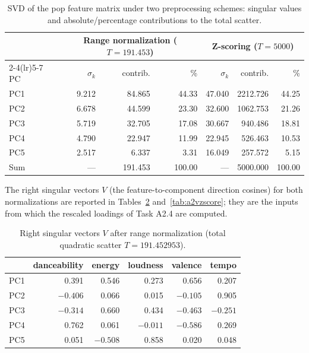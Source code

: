 \documentclass[11pt,letterpaper]{article}
\begin{document}
\begin{table}[H]
\centering
\caption{SVD of the pop feature matrix under two preprocessing schemes:
singular values and absolute/percentage contributions to the total scatter.}
\label{tab:a2svd}
\small
\begin{tabular}{lrrrrrr}
\toprule
 & \multicolumn{3}{c}{Range normalization ($T=191.453$)} & \multicolumn{3}{c}{Z-scoring ($T=5000$)} \\
\cmidrule(lr){2-4}\cmidrule(lr){5-7}
PC & $\sigma_k$ & contrib. & \% & $\sigma_k$ & contrib. & \% \\
\midrule
PC1 & 9.212 & 84.865 & 44.33 & 47.040 & 2212.726 & 44.25 \\
PC2 & 6.678 & 44.599 & 23.30 & 32.600 & 1062.753 & 21.26 \\
PC3 & 5.719 & 32.705 & 17.08 & 30.667 & 940.486  & 18.81 \\
PC4 & 4.790 & 22.947 & 11.99 & 22.945 & 526.463  & 10.53 \\
PC5 & 2.517 & 6.337  & 3.31  & 16.049 & 257.572  & 5.15  \\
\midrule
Sum & --- & 191.453 & 100.00 & --- & 5000.000 & 100.00 \\
\bottomrule
\end{tabular}
\end{table}

The right singular vectors $V$ (the feature-to-component direction cosines)
for both normalizations are reported in Tables~\ref{tab:a2vrange}
and~\ref{tab:a2vzscore}; they are the inputs from which the rescaled loadings
of Task A2.4 are computed.

\begin{table}[H]
\centering
\caption{Right singular vectors $V$ after range normalization (total
quadratic scatter $T = 191.452953$).}
\label{tab:a2vrange}
\small
\begin{tabular}{lrrrrr}
\toprule
 & danceability & energy & loudness & valence & tempo \\
\midrule
PC1 &  0.391 &  0.546 &  0.273 &  0.656 &  0.207 \\
PC2 & $-0.406$ &  0.066 &  0.015 & $-0.105$ &  0.905 \\
PC3 & $-0.314$ &  0.660 &  0.434 & $-0.463$ & $-0.251$ \\
PC4 &  0.762 &  0.061 & $-0.011$ & $-0.586$ &  0.269 \\
PC5 &  0.051 & $-0.508$ &  0.858 &  0.020 &  0.048 \\
\bottomrule
\end{tabular}
\end{table}
\end{document}
